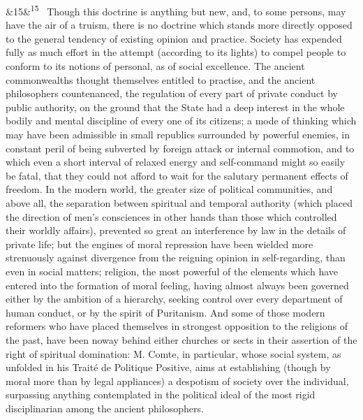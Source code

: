 \documentclass[12pt]{article}
\newcommand{\para}[1][]{\par\noindent\ifx&#1&\else\textsuperscript{\footnotesize #1}~\fi}
\begin{document}
\para[15] Though this doctrine is anything but new, and, to some persons, may have the air of a truism, there is no doctrine which stands more directly opposed to the general tendency of existing opinion and practice. Society has expended fully as much effort in the attempt (according to its lights) to compel people to conform to its notions of personal, as of social excellence. The ancient commonwealths thought themselves entitled to practise, and the ancient philosophers countenanced, the regulation of every part of private conduct by public authority, on the ground that the State had a deep interest in the whole bodily and mental discipline of every one of its citizens; a mode of thinking which may have been admissible in small republics surrounded by powerful enemies, in constant peril of being subverted by foreign attack or internal commotion, and to which even a short interval of relaxed energy and self-command might so easily be fatal, that they could not afford to wait for the salutary permanent effects of freedom. In the modern world, the greater size of political communities, and above all, the separation between spiritual and temporal authority (which placed the direction of men's consciences in other hands than those which controlled their worldly affairs), prevented so great an interference by law in the details of private life; but the engines of moral repression have been wielded more strenuously against divergence from the reigning opinion in self-regarding, than even in social matters; religion, the most powerful of the elements which have entered into the formation of moral feeling, having almost always been governed either by the ambition of a hierarchy, seeking control over every department of human conduct, or by the spirit of Puritanism. And some of those modern reformers who have placed themselves in strongest opposition to the religions of the past, have been noway behind either churches or sects in their assertion of the right of spiritual domination: M. Comte, in particular, whose social system, as unfolded in his Traité de Politique Positive, aims at establishing (though by moral more than by legal appliances) a despotism of society over the individual, surpassing anything contemplated in the political ideal of the most rigid disciplinarian among the ancient philosophers.
\end{document}
